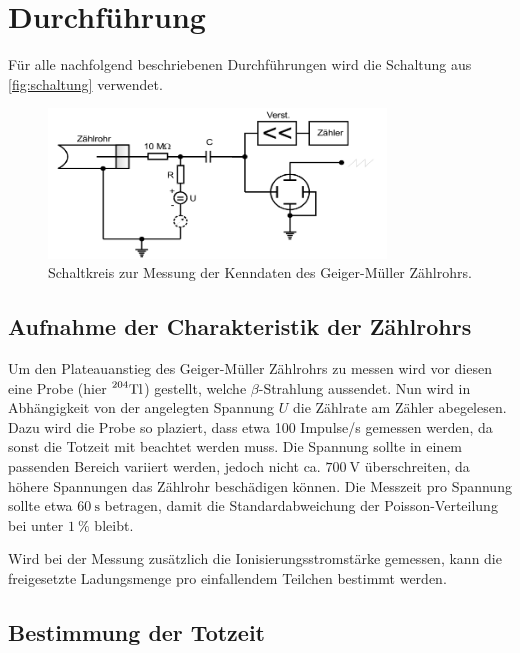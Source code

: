 \section{Durchführung}
\label{sec:Durchführung}

Für alle nachfolgend beschriebenen Durchführungen wird die Schaltung aus \autoref{fig:schaltung} verwendet.

\begin{figure}
    \centering
    \includegraphics[width=0.8\textwidth]{images/skizze_4.png}
    \caption{Schaltkreis zur Messung der Kenndaten des Geiger-Müller Zählrohrs.\cite{V703}}
    \label{fig:schaltung}
\end{figure}

\subsection{Aufnahme der Charakteristik der Zählrohrs}
\label{ssec:charakteristik_durchführung}

Um den Plateauanstieg des Geiger-Müller Zählrohrs zu messen wird vor diesen eine Probe (hier $\prescript{204}{}{\text{Tl}}$) gestellt, welche $\beta$-Strahlung aussendet.
Nun wird in Abhängigkeit von der angelegten Spannung $U$ die Zählrate am Zähler abegelesen.
Dazu wird die Probe so plaziert, dass etwa 100 Impulse/s gemessen werden, da sonst die Totzeit mit beachtet werden muss.
Die Spannung sollte in einem passenden Bereich variiert werden, jedoch nicht ca. $\SI{700}{\volt}$ überschreiten, da höhere Spannungen das Zählrohr beschädigen können.
Die Messzeit pro Spannung sollte etwa $\SI{60}{\second}$ betragen, damit die Standardabweichung der Poisson-Verteilung bei unter $\SI{1}{\percent}$ bleibt.

Wird bei der Messung zusätzlich die Ionisierungsstromstärke gemessen, kann die freigesetzte Ladungsmenge pro einfallendem Teilchen bestimmt werden.

\subsection{Bestimmung der Totzeit}
\label{ssec:totzeit_durchführung}

